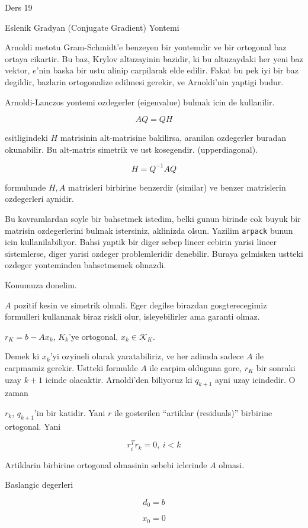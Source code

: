\documentclass[12pt,fleqn]{article}\usepackage{../common}
\begin{document}
Ders 19

Eslenik Gradyan (Conjugate Gradient) Yontemi 

Arnoldi metotu Gram-Schmidt'e benzeyen bir yontemdir ve bir ortogonal baz
ortaya cikartir. Bu baz, Krylov altuzayinin bazidir, ki bu altuzaydaki her
yeni baz vektor, $e$'nin baska bir ustu alinip carpilarak elde
edilir. Fakat bu pek iyi bir baz degildir, bazlarin ortogonalize edilmesi
gerekir, ve Arnoldi'nin yaptigi budur.

Arnoldi-Lanczos yontemi ozdegerler (eigenvalue) bulmak icin de kullanilir.

\[ AQ = QH \]

esitligindeki $H$ matrisinin alt-matrisine bakilirsa, aranilan ozdegerler
buradan okunabilir. Bu alt-matris simetrik ve ust kosegendir.
(upperdiagonal). 

\[ H = Q^{-1}AQ \]

formulunde $H,A$ matrisleri birbirine benzerdir (similar) ve benzer
matrislerin ozdegerleri aynidir. 

Bu kavramlardan soyle bir bahsetmek istedim, belki gunun birinde cok buyuk
bir matrisin ozdegerlerini bulmak istersiniz, aklinizda olsun. Yazilim
\verb!arpack! bunun icin kullanilabiliyor. Bahsi yaptik bir diger sebep
lineer cebirin yarisi lineer sistemlerse, diger yarisi ozdeger
problemleridir denebilir. Buraya gelmisken ustteki ozdeger yonteminden
bahsetmemek olmazdi. 

Konumuza donelim. 

$A$ pozitif kesin ve simetrik olmali. Eger degilse birazdan gosgterecegimiz
formulleri kullanmak biraz riskli olur, isleyebilirler ama garanti olmaz. 

$r_K = b - Ax_k $, $K_k$'ye ortogonal, $x_k \in \mathscr{K}_K$. 

Demek ki $x_k$'yi ozyineli olarak yaratabiliriz, ve her adimda sadece $A$
ile carpmamiz gerekir. Ustteki formulde $A$ ile carpim olduguna gore, $r_K$
bir sonraki uzay $k+1$ icinde olacaktir. Arnoldi'den biliyoruz ki $q_{k+1}$
ayni uzay icindedir. O zaman 

$r_k$, $q_{k+1}$'in bir katidir. Yani $r$ ile gosterilen ``artiklar
(residuals)'' birbirine ortogonal. Yani 

\[ r_i^Tr_k = 0, \ i < k \]

Artiklarin birbirine ortogonal olmasinin sebebi iclerinde $A$ olmasi. 

Baslangic degerleri

\[ d_0 = b \]

\[ x_0 = 0 \]
\end{document}
